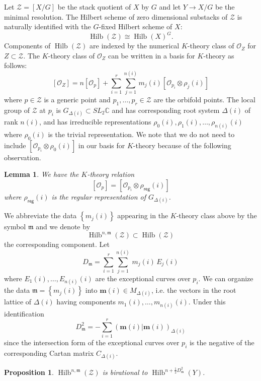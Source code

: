 \documentclass{amsart}
\newtheorem{proposition}[theorem]{Proposition}
\newtheorem{lemma}[theorem]{Lemma}
\theoremstyle{definition}
\newcommand{\half}{\frac{1}{2}}
\newcommand{\CC} {{\mathbb C}}          %
\newcommand{\reg}{\mathsf{reg}}
\newcommand{\mdata}{\mathfrak{m}}
\renewcommand{\O}{\mathcal{O}}
\newcommand{\Zcal}{\mathcal{Z}}
\newcommand{\mvec}{\bm{m}}
\newcommand{\Hilb}{\operatorname{Hilb}}
\begin{document}
Let $\Zcal  =[X/G]$ be the stack quotient of $X$ by $G$ and let $Y\to
X/G$ be the minimal resolution. %
The Hilbert scheme of zero dimensional substacks of $\Zcal$ is
naturally identified with the $G$-fixed Hilbert scheme of $X$:
\[
\Hilb (\Zcal )\cong \Hilb (X)^{G}.
\]
Components of $\Hilb (\Zcal )$ are indexed by the numerical $K$-theory
class of $\O_{Z}$ for $Z\subset \Zcal$. The $K$-theory class of
$\O_{Z}$ can be written in a basis for $K$-theory as follows:
\[
[\O_{Z}] = n[\O_{p}] + \sum_{i=1}^{r} \sum_{j=1}^{n(i)}
m_{j}(i)[\O_{p_{i}}\otimes \rho_{j}(i)] 
\]
where $p\in \Zcal$ is a generic point and $p_{1},\dotsc ,p_{r}\in \Zcal$
are the orbifold points. The local group of $\Zcal$ at $p_{i}$ is
$G_{\Delta (i)}\subset SL_{2}\CC$  and has corresponding root system
$\Delta (i)$ of rank $n(i)$, and has irreducible representations
$\rho_{0}(i),\rho_{1}(i),\dotsc ,\rho_{n(i)}(i)$ where $\rho_{0}(i)$
is the trivial representation. 
We note that we do not need to include $ [\O_{p_{i}}\otimes
\rho_{0}(i)]$ in our basis for $K$-theory because of the following observation.
\begin{lemma} 
\label{ref:kthbasis}	
We have the $K$-theory relation
\[
[\O_{p}] = [\O_{p_{i}}\otimes \rho_{\reg}(i)]
\]
where $\rho_{\reg}(i)$ is the regular representation of $G_{\Delta
	(i)}$.\end{lemma}

We abbreviate the data $\left\{m_{j}(i) \right\}$ appearing in the $K$-theory class above  by the symbol
$\mdata$ and we denote by 
\[
\Hilb^{n,\mdata}(\Zcal ) \subset \Hilb (\Zcal )
\]
the corresponding component. Let
\[
D_{\mdata} = \sum_{i=1}^{r} \sum_{j=1}^{n(i)} \, m_{j}(i)\, E_{j}(i)
\]
where
$E_{1}(i),\dotsc ,E_{n(i)}(i)$ are
the exceptional curves over $p_{i}$. We can organize the data $\mdata = \left\{m_{j}(i) \right\}$ into
$\mvec (i)\in M_{\Delta (i)}$, i.e.  the vectors in the root lattice
of $\Delta (i)$ having components $ m_{1}(i),\dotsc
,m_{n(i)}(i)$. Under this identification
\[
D_{\mdata}^{2} = -\sum_{i=1}^{r} \left(\mvec (i)|\mvec (i)
\right)_{\Delta (i)} 
\]
since the intersection form of the exceptional curves over $p_{i}$ is
the negative of the corresponding Cartan matrix $C_{\Delta (i)}$. 


\begin{proposition}\label{prop: Hilb(Z) is birational to Hilb(Y)}
	$\Hilb^{n,\mdata}(\Zcal)$ is birational to $\Hilb^{n+\half
		D_{\mdata}^{2}}(Y)$. 
\end{proposition}
\end{document}

